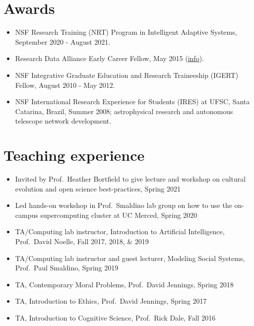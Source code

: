 \documentclass[letterpaper,11pt,oneside]{article}
\begin{document}

\noindent
\section*{\textcolor{gunmetal}{Awards}}
\begin{itemize}
  \item NSF Research Training (NRT) Program in Intelligent Adaptive Systems, September 2020 - August 2021.
  \item Research Data Alliance Early Career Fellow, May 2015
    (\href{https://rd-alliance.org/rda_us data share program}{info}).
  \item NSF Integrative Graduate Education and Research Traineeship (IGERT) Fellow, August 2010 - May 2012.
  \item NSF International Research Experience for Students (IRES) at UFSC,
    Santa Catarina, Brazil, Summer 2008;
    astrophysical research and autonomous telescope network development.
\end{itemize}

\noindent
\section*{\textcolor{gunmetal}{Teaching experience}}
\begin{itemize}
  \item Invited by Prof.\ Heather Bortfield to give lecture and workshop on cultural evolution and open science best-practices, Spring 2021
  \item Led hands-on workshop in Prof.\ Smaldino lab group on how to use the on-campus supercomputing cluster at UC Merced, Spring 2020
  \item TA/Computing lab instructor, Introduction to Artificial Intelligence, Prof.\ David Noelle, Fall 2017, 2018, \& 2019
  \item TA/Computing lab instructor and guest lecturer, Modeling Social Systems, Prof.\ Paul Smaldino, Spring 2019
  \item TA, Contemporary Moral Problems, Prof.\ David Jennings, Spring 2018
  \item TA, Introduction to Ethics, Prof.\ David Jennings, Spring 2017
  \item TA, Introduction to Cognitive Science, Prof.\ Rick Dale, Fall 2016
\end{itemize}
\end{document}
